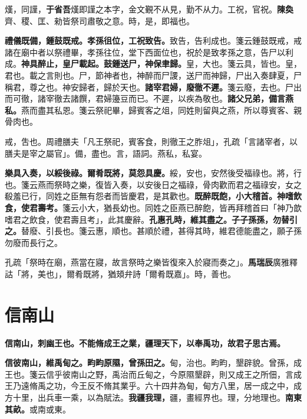 \begin{quoting}熯，同謹，\textbf{于省吾}熯即謹之本字，金文覲不从見，勤不从力。工祝，官祝。\textbf{陳奐}齊、稷、匡、勑皆祭司肅敬之意。時，是，即福也。\end{quoting}

\textbf{禮儀既備，鍾鼓既戒。孝孫徂位，工祝致告。}{\footnotesize 致告，告利成也。箋云鍾鼓既戒，戒諸在廟中者以祭禮畢，孝孫往位，堂下西面位也，祝於是致孝孫之意，告尸以利成。}\textbf{神具醉止，皇尸載起。鼓鍾送尸，神保聿歸。}{\footnotesize 皇，大也。箋云具，皆也。皇，君也。載之言則也。尸，節神者也，神醉而尸謖，送尸而神歸，尸出入奏肆夏，尸稱君，尊之也。神安歸者，歸於天也。}\textbf{諸宰君婦，廢徹不遲。}{\footnotesize 箋云廢，去也。尸出而可徹，諸宰徹去諸饌，君婦籩豆而已。不遲，以疾為敬也。}\textbf{諸父兄弟，備言燕私。}{\footnotesize 燕而盡其私恩。箋云祭祀畢，歸賓客之俎，同姓則留與之燕，所以尊賓客、親骨肉也。}

\begin{quoting}戒，吿也。周禮膳夫「凡王祭祀，賓客食，則徹王之胙俎」，孔疏「言諸宰者，以膳夫是宰之屬官」。備，盡也。言，語詞。燕私，私宴。\end{quoting}

\textbf{樂具入奏，以綏後祿。爾肴既將，莫怨具慶。}{\footnotesize 綏，安也，安然後受福祿也。將，行也。箋云燕而祭時之樂，復皆入奏，以安後日之福祿，骨肉歡而君之福祿安，女之殽羞已行，同姓之臣無有怨者而皆慶君，是其歡也。}\textbf{既醉既飽，小大稽首。神嗜飲食，使君壽考。}{\footnotesize 箋云小大，猶長幼也。同姓之臣燕已醉飽，皆再拜稽首曰「神乃歆嗜君之飲食，使君壽且考」，此其慶辭。}\textbf{孔惠孔時，維其盡之。子子孫孫，勿替引之。}{\footnotesize 替廢、引長也。箋云惠，順也。甚順於禮，甚得其時，維君德能盡之，願子孫勿廢而長行之。}

\begin{quoting}孔疏「祭時在廟，燕當在寢，故言祭時之樂皆復來入於寢而奏之」。\textbf{馬瑞辰}廣雅釋詁「將，美也」，爾肴既將，猶頍弁詩「爾肴既嘉」。時，善也。\end{quoting}

\section{信南山}


\textbf{信南山，刺幽王也。不能脩成王之業，疆理天下，以奉禹功，故君子思古焉。}

\textbf{信彼南山，維禹甸之。畇畇原隰，曾孫田之。}{\footnotesize 甸，治也。畇畇，墾辟貌。曾孫，成王也。箋云信乎彼南山之野，禹治而丘甸之，今原隰墾辟，則又成王之所佃，言成王乃遠脩禹之功，今王反不脩其業乎。六十四井為甸，甸方八里，居一成之中，成方十里，出兵車一乘，以為賦法。}\textbf{我疆我理，}{\footnotesize 疆，畫經界也。理，分地理也。}\textbf{南東其畝。}{\footnotesize 或南或東。}

